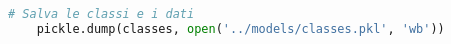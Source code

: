 \begin{lstlisting}[language=Python, caption=Utilizzo di Pickle nel codice]
# Salva le classi e i dati
	pickle.dump(classes, open('../models/classes.pkl', 'wb'))
\end{lstlisting}